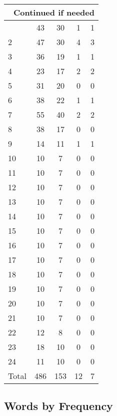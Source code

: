 \begin{center}
\begin{longtable}{l|c|c|c|c}
\hline \multicolumn{5}{|r|}{{Continued if needed}} \\ \hline
\endfoot 
1 & 43 & 30 & 1 & 1\\ \hline
2 & 47 & 30 & 4 & 3\\ \hline
3 & 36 & 19 & 1 & 1\\ \hline
4 & 23 & 17 & 2 & 2\\ \hline
5 & 31 & 20 & 0 & 0\\ \hline
6 & 38 & 22 & 1 & 1\\ \hline
7 & 55 & 40 & 2 & 2\\ \hline
8 & 38 & 17 & 0 & 0\\ \hline
9 & 14 & 11 & 1 & 1\\ \hline
10 & 10 & 7 & 0 & 0\\ \hline
11 & 10 & 7 & 0 & 0\\ \hline
12 & 10 & 7 & 0 & 0\\ \hline
13 & 10 & 7 & 0 & 0\\ \hline
14 & 10 & 7 & 0 & 0\\ \hline
15 & 10 & 7 & 0 & 0\\ \hline
16 & 10 & 7 & 0 & 0\\ \hline
17 & 10 & 7 & 0 & 0\\ \hline
18 & 10 & 7 & 0 & 0\\ \hline
19 & 10 & 7 & 0 & 0\\ \hline
20 & 10 & 7 & 0 & 0\\ \hline
21 & 10 & 7 & 0 & 0\\ \hline
22 & 12 & 8 & 0 & 0\\ \hline
23 & 18 & 10 & 0 & 0\\ \hline
24 & 11 & 10 & 0 & 0\\ \hline
\hline \hline
Total & 486 & 153 & 12 & 7



\end{longtable}
\end{center}

 
\subsection{Words by Frequency}

